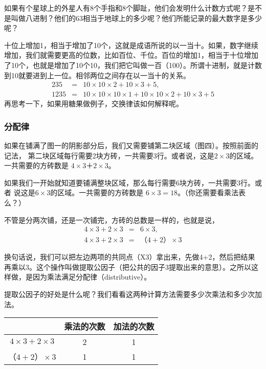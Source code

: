  如果有个星球上的外星人有8个手指和8个脚趾，他们会发明什么计数方式呢？是不是叫做八进制？他们的63相当于地球上的多少呢？他们所能记录的最大数字是多少呢？

  十位上增加1，相当于增加了10个，这就是成语所说的以一当十。如果，数字继续增加，我们就需要更高的位数，比如百位、千位。百位的增加1，相当于十位增加了10个，也就是增加了10个10，我们把它叫做一百（100）。所谓十进制，就是计数到10就要进到上一位。相邻两位之间存在以一当十的关系。
    \begin{eqnarray}
    235 &=& 10\times10\times2 + 10\times3 + 5, \\
    1235 &=& 10\times10\times10\times1 + 10\times10\times2 + 10\times3 + 5
    \end{eqnarray}
  再思考一下，如果用糖果做例子，交换律该如何解释呢。

\subsubsection{分配律}

如果在铺满了图一的阴影部分后，我们又需要铺第二块区域（图四）。按照前面的记法，	第二块区域每行需要2块方砖，一共需要3行。或者说，这是$2\times3$的区域。一共需要的方砖数是
$4\times3＋2\times3$。

  如果我们一开始就知道要铺满整块区域，那么每行需要6块方砖，一共需要3行。或者	说这是$6\times3$的区域。一共需要的方砖数是
    $6\times3 = 18$。（你还需要看乘法表么？）

  不管是分两次铺，还是一次铺完，方砖的总数是一样的，也就是说，
  \begin{eqnarray}
    4\times3+2\times3 &=& 6\times3,\\
    4\times3+2\times3 &=& （4+2）\times3
  \end{eqnarray}
  
  换句话说，我们可以把左边两项的共同点（X3）拿出来，先做4+2，然后把结果再乘以3。这个操作叫做提取公因子（把公共的因子3提取出来的意思）。之所以这样做，是因为乘法满足分配律（distributive）。

  提取公因子的好处是什么呢？我们看看这两种计算方法需要多少次乘法和多少次加法。
\begin{table}
    \center
    \begin{tabular}{c c c}
  &乘法的次数&加法的次数\\
\hline
    $4\times3+2\times3$&	2&	1\\
    $（4+2）\times3$&	1&	1
    \end{tabular}
\end{table}
    
